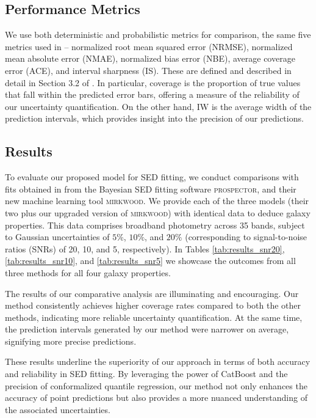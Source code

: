 \documentclass[letterpaper]{article} %
\begin{document}
\vspace{-1.46mm}
\subsection{Performance Metrics}
We use both deterministic and probabilistic metrics for comparison, the same five metrics used in \citet{Gilda21} -- normalized root mean squared error (NRMSE), normalized mean absolute error (NMAE), normalized bias error (NBE), average coverage error (ACE), and interval sharpness (IS). These are defined and described in detail in Section 3.2 of \citet{Gilda21}. In particular, coverage is the proportion of true values that fall within the predicted error bars, offering a measure of the reliability of our uncertainty quantification. On the other hand, IW is the average width of the prediction intervals, which provides insight into the precision of our predictions.

\subsection{Results}
To evaluate our proposed model for SED fitting, we conduct comparisons with fits obtained in \citet{Gilda21} from the Bayesian SED fitting software \textsc{prospector}, and their new machine learning tool \textsc{mirkwood}. We provide each of the three models (their two plus our upgraded version of \textsc{mirkwood}) with identical data to deduce galaxy properties. This data comprises broadband photometry across 35 bands, subject to Gaussian uncertainties of $5\%$, $10\%$, and $20\%$ (corresponding to signal-to-noise ratios (SNRs) of 20, 10, and 5, respectively). In Tables \ref{tab:results_snr20}, \ref{tab:results_snr10}, and \ref{tab:results_snr5} we showcase the outcomes from all three methods for all four galaxy properties.

The results of our comparative analysis are illuminating and encouraging. Our method consistently achieves higher coverage rates compared to both the other methods, indicating more reliable uncertainty quantification. At the same time, the prediction intervals generated by our method were narrower on average, signifying more precise predictions.

These results underline the superiority of our approach in terms of both accuracy and reliability in SED fitting. By leveraging the power of CatBoost and the precision of conformalized quantile regression, our method not only enhances the accuracy of point predictions but also provides a more nuanced understanding of the associated uncertainties.
\end{document}
